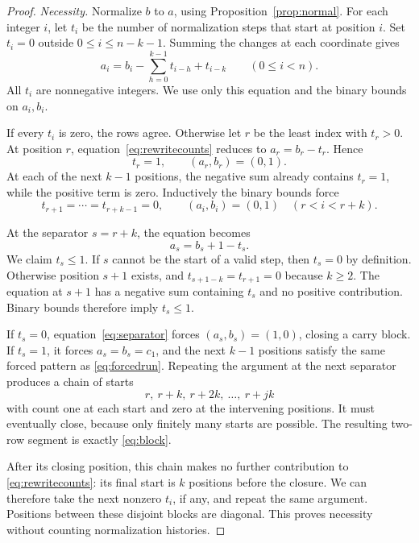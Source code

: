 \documentclass[11pt,letterpaper]{article}
\numberwithin{equation}{section}
\theoremstyle{definition}
\theoremstyle{remark}
\begin{document}
\begin{proof}
\emph{Necessity.} Normalize $b$ to $a$, using
Proposition~\ref{prop:normal}. For each integer $i$, let $t_i$ be the
number of normalization steps that start at position $i$. Set $t_i=0$
outside $0\le i\le n-k-1$. Summing the changes at each coordinate gives
\begin{equation}
 a_i=b_i-\sum_{h=0}^{k-1}t_{i-h}+t_{i-k}
 \qquad(0\le i<n).
 \label{eq:rewritecounts}
\end{equation}
All $t_i$ are nonnegative integers. We use only this equation and the
binary bounds on $a_i,b_i$.

If every $t_i$ is zero, the rows agree. Otherwise let $r$ be the least
index with $t_r>0$. At position $r$, equation~\eqref{eq:rewritecounts}
reduces to $a_r=b_r-t_r$. Hence
\[
 t_r=1,\qquad (a_r,b_r)=(0,1).
\]
At each of the next $k-1$ positions, the negative sum already contains
$t_r=1$, while the positive term is zero. Inductively the binary bounds
force
\begin{equation}
 t_{r+1}=\cdots=t_{r+k-1}=0,
 \qquad
 (a_i,b_i)=(0,1)\quad(r<i<r+k).
 \label{eq:forcedrun}
\end{equation}

At the separator $s=r+k$, the equation becomes
\begin{equation}
 a_s=b_s+1-t_s.
 \label{eq:separator}
\end{equation}
We claim $t_s\le1$. If $s$ cannot be the start of a valid step, then
$t_s=0$ by definition. Otherwise position $s+1$ exists, and
$t_{s+1-k}=t_{r+1}=0$ because $k\ge2$. The equation at $s+1$ has a
negative sum containing $t_s$ and no positive contribution. Binary bounds
therefore imply $t_s\le1$.

If $t_s=0$, equation~\eqref{eq:separator} forces
$(a_s,b_s)=(1,0)$, closing a carry block. If $t_s=1$, it forces
$a_s=b_s=c_1$, and the next $k-1$ positions satisfy the same forced pattern
as \eqref{eq:forcedrun}. Repeating the argument at the next separator
produces a chain of starts
\[
 r,\ r+k,\ r+2k,\ \ldots,\ r+jk
\]
with count one at each start and zero at the intervening positions.
It must eventually close, because only finitely many starts are possible.
The resulting two-row segment is exactly \eqref{eq:block}.

After its closing position, this chain makes no further contribution to
\eqref{eq:rewritecounts}: its final start is $k$ positions before the
closure. We can therefore take the next nonzero $t_i$, if any, and repeat
the same argument. Positions between these disjoint blocks are diagonal.
This proves necessity without counting normalization histories.


\end{proof}
\end{document}
